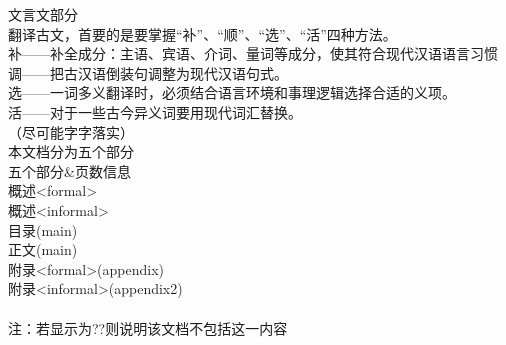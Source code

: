 文言文部分\\
翻译古文，首要的是要掌握“补”、“顺”、“选”、“活”四种方法。\\
补——补全成分：主语、宾语、介词、量词等成分，使其符合现代汉语语言习惯\\
调——把古汉语倒装句调整为现代汉语句式。\\
选——一词多义翻译时，必须结合语言环境和事理逻辑选择合适的义项。\\
活——对于一些古今异义词要用现代词汇替换。\\
（尽可能字字落实）
\\
本文档分为五个部分\\
五个部分\&页数信息\\
概述<formal>\pageref{abstractformal}\\
概述<informal>\pageref{abstractinformal}\\
目录(main)\pageref{contents}\\
正文(main)\pageref{main}\\
附录<formal>(appendix)\pageref{appendixformal}\\
附录<informal>(appendix2)\pageref{appendixinformal}\\
\\
注：若显示为??则说明该文档不包括这一内容\label{appendixformal} \\
\\ 